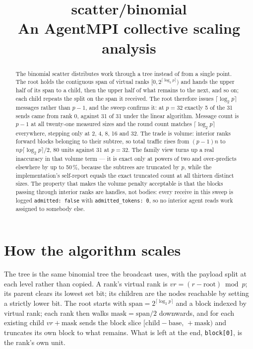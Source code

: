 \documentclass[11pt]{article}
\title{\textbf{scatter/binomial}\\[2pt]\large An AgentMPI collective scaling analysis}
\author{}
\date{}
\begin{document}
\maketitle

\begin{abstract}
The binomial scatter distributes work through a tree instead of from a single point. The root
holds the contiguous span of virtual ranks $[0, 2^{\lceil\log_2 p\rceil})$ and hands the upper
half of its span to a child, then the upper half of what remains to the next, and so on; each
child repeats the split on the span it received. The root therefore issues
$\lceil\log_2 p\rceil$ messages rather than $p-1$, and the sweep confirms it: at $p=32$ exactly 5
of the 31 sends came from rank 0, against 31 of 31 under the linear algorithm. Message count is
$p-1$ at all twenty-one measured sizes and the round count matches $\lceil\log_2 p\rceil$
everywhere, stepping only at 2, 4, 8, 16 and 32. The trade is volume: interior ranks forward
blocks belonging to their subtree, so total traffic rises from $(p-1)n$ to
$np\lceil\log_2 p\rceil/2$, 80 units against 31 at $p=32$. The family view turns up a real
inaccuracy in that volume term --- it is exact only at powers of two and over-predicts elsewhere
by up to 50\,\%, because the subtrees are truncated by $p$, while the implementation's self-report
equals the exact truncated count at all thirteen distinct sizes. The property that makes the
volume penalty acceptable is that the blocks passing through interior ranks are handles, not
bodies: every receive in this sweep is logged \texttt{admitted: false} with
\texttt{admitted\_tokens: 0}, so no interior agent reads work assigned to somebody else.
\end{abstract}



\section{How the algorithm scales}

The tree is the same binomial tree the broadcast uses, with the payload split at each level rather
than copied. A rank's virtual rank is $vr = (r - \text{root}) \bmod p$; its parent clears its
lowest set bit; its children are the nodes reachable by setting a strictly lower bit. The root
starts with $\text{span} = 2^{\lceil\log_2 p\rceil}$ and a block indexed by virtual rank; each
rank then walks $\text{mask} = \text{span}/2$ downwards, and for each existing child
$vr + \text{mask}$ sends the block slice $[\text{child} - \text{base},\, +\text{mask})$ and
truncates its own block to what remains. What is left at the end, \texttt{block[0]}, is the rank's
own unit.
\end{document}
